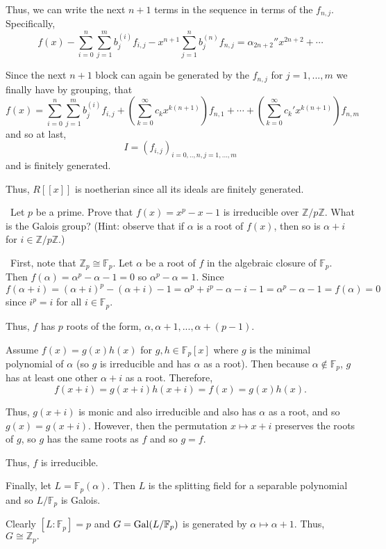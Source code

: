 \documentclass[12pt]{Qual}
\begin{document}
\begin{solution}
Thus, we can write the next $n+1$ terms in the sequence in terms of the $f_{n,j}$. Specifically,
$$f(x)-\sum_{i=0}^n\sum_{j=1}^mb_j^{(i)}f_{i,j}-x^{n+1}\sum_{j=1}^nb_j^{(n)}f_{n,j}=\alpha_{2n+2}''x^{2n+2}+\cdots$$

Since the next $n+1$ block can again be generated by the $f_{n,j}$ for $j=1,...,m$ we finally have by grouping, that $$f(x)=\sum_{i=0}^n\sum_{j=1}^mb_j^{(i)}f_{i,j}+\left(\sum_{k=0}^\infty c_kx^{k(n+1)}\right)f_{n,1}+\cdots+\left(\sum_{k=0}^\infty c_k'x^{k(n+1)}\right)f_{n,m}$$ and so at last, $$I=(f_{i,j})_{i=0,..,n,j=1,...,m}$$ and is finitely generated.

Thus, $R[[x]]$ is noetherian since all its ideals are finitely generated.

\end{solution}
\newpage



\begin{problem} $\,$
Let $p$ be a prime. Prove that $f(x)=x^p-x-1$ is irreducible over $\mathbb{Z}/p\mathbb{Z}$. What is the Galois group? (Hint: observe that if $\alpha$ is a root of $f(x)$, then so is $\alpha+i$ for $i\in\mathbb{Z}/p\mathbb{Z}$.)
\end{problem}


\begin{solution}$\,$
First, note that $\mathbb{Z}_p\cong\mathbb{F}_p$. Let $\alpha$ be a root of $f$ in the algebraic closure of $\mathbb{F}_p$. Then $f(\alpha)=\alpha^p-\alpha-1=0$ so $\alpha^p-\alpha=1$. Since $$f(\alpha+i)=(\alpha+i)^p-(\alpha+i)-1=\alpha^p+i^p-\alpha-i-1=\alpha^p-\alpha-1=f(\alpha)=0$$ since $i^p=i$ for all $i\in\mathbb{F}_p.$

Thus, $f$ has $p$ roots of the form, $\alpha,\alpha+1,...,\alpha+(p-1).$

Assume $f(x)=g(x)h(x)$ for $g,h\in\mathbb{F}_p[x]$ where $g$ is the minimal polynomial of $\alpha$ (so $g$ is irreducible and has $\alpha$ as a root). Then because $\alpha\notin\mathbb{F}_p$, $g$ has at least one other $\alpha+i$ as a root. Therefore, $$f(x+i)=g(x+i)h(x+i)=f(x)=g(x)h(x).$$

Thus, $g(x+i)$ is monic and also irreducible and also has $\alpha$ as a root, and so $g(x)=g(x+i)$. However, then the permutation $x\mapsto x+i$ preserves the roots of $g$, so $g$ has the same roots as $f$ and so $g=f.$

Thus, $f$ is irreducible.

Finally, let $L=\mathbb{F}_p(\alpha)$. Then $L$ is the splitting field for a separable polynomial and so $L/\mathbb{F}_p$ is Galois.

Clearly $[L:\mathbb{F}_p]=p$ and $G=\text{Gal}(L/\mathbb{F}_p)$ is generated by $\alpha\mapsto\alpha+1$. Thus, $G\cong\mathbb{Z}_p.$
\end{solution}
\newpage
\end{document}
